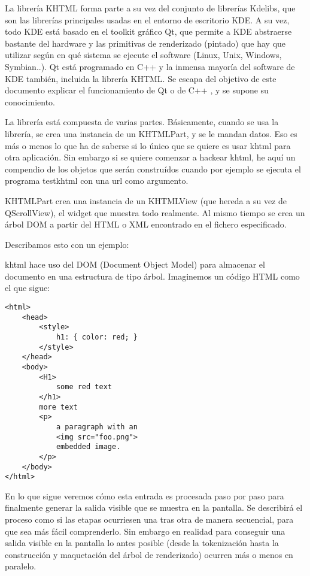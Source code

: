 La librería KHTML forma parte a su vez del conjunto de librerías Kdelibs, que son las librerías principales usadas en el entorno de escritorio KDE. A su vez, todo KDE está basado en el toolkit gráfico Qt, que permite a KDE abstraerse bastante del hardware y las primitivas de renderizado (pintado) que hay que utilizar según en qué sistema se ejecute el software (Linux, Unix, Windows, Symbian..). Qt está programado en C++ y la inmensa mayoría del software de KDE también, incluida la librería KHTML. Se escapa del objetivo de este documento explicar el funcionamiento de Qt  \cite{qt_official_webpage} o de C++  \cite{pensar_en_cpp}, y se supone su conocimiento.

La librería está compuesta de varias partes. Básicamente, cuando se usa la librería, se crea una instancia de un KHTMLPart, y se le mandan datos. Eso es más o menos lo que ha de saberse si lo único que se quiere es usar khtml para otra aplicación. Sin embargo si se quiere comenzar a hackear khtml, he aquí un compendio de los objetos que serán construídos cuando por ejemplo se ejecuta el programa testkhtml con una url como argumento.

KHTMLPart crea una instancia de un KHTMLView (que hereda a su vez de QScrollView), el widget que muestra todo realmente. Al mismo tiempo se crea un árbol DOM a partir del HTML o XML encontrado en el fichero especificado.

Describamos esto con un ejemplo:

khtml hace uso del DOM (Document Object Model) para almacenar el documento en una estructura de tipo árbol. Imaginemos un código HTML como el que sigue:

\begin{verbatim}
<html>
    <head>
        <style>
            h1: { color: red; }
        </style>
    </head>
    <body>
        <H1>
            some red text
        </h1>
        more text
        <p>
            a paragraph with an
            <img src="foo.png">
            embedded image.
        </p>
    </body>
</html>
\end{verbatim} 

En lo que sigue veremos cómo esta entrada es procesada paso por paso para finalmente generar la salida visible que se muestra en la pantalla. Se describirá el proceso como si las etapas ocurriesen una tras otra de manera secuencial, para que sea más fácil comprenderlo. Sin embargo en realidad para conseguir una salida visible en la pantalla lo antes posible (desde la tokenización hasta la construcción y maquetación del árbol de renderizado) ocurren más o menos en paralelo.

